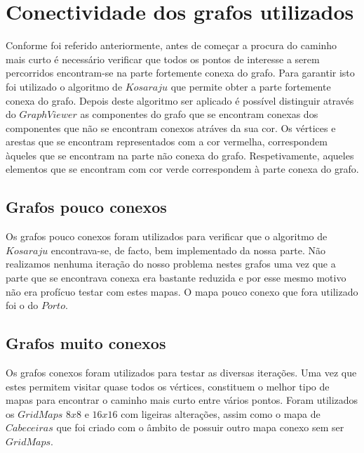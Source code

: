 \documentclass[article, a4paper, 12pt, oneside]{memoir}
\begin{document}
\newpage
\chapter[Conectividade dos grafos utilizados][Conectividade dos grafos utilizados]{Conectividade dos grafos utilizados} \label{\thechapter}

Conforme foi referido anteriormente, antes de começar a procura do caminho mais curto é necessário verificar que todos os pontos de interesse a serem percorridos encontram-se na
parte fortemente conexa do grafo. Para garantir isto foi utilizado o algoritmo de $Kosaraju$ que permite obter a parte fortemente conexa do grafo. Depois deste algoritmo ser aplicado
é possível distinguir através do $GraphViewer$ as componentes do grafo que se encontram conexas dos componentes que não se encontram conexos atráves da sua cor. Os vértices e arestas
que se encontram representados com a cor vermelha, correspondem àqueles que se encontram na parte não conexa do grafo. Respetivamente, aqueles elementos que se encontram com cor
verde correspondem à parte conexa do grafo.

\section{Grafos pouco conexos}
Os grafos pouco conexos foram utilizados para verificar que o algoritmo de $Kosaraju$ encontrava-se, de facto, bem implementado da nossa parte. Não 
realizamos nenhuma iteração do nosso problema nestes grafos uma vez que a parte que se encontrava conexa era bastante reduzida e por esse mesmo motivo não era profícuo
testar com estes mapas.
O mapa pouco conexo que fora utilizado foi o do $Porto$.

\section{Grafos muito conexos}
Os grafos conexos foram utilizados para testar as diversas iterações. Uma vez que estes permitem visitar quase todos os vértices, constituem o melhor tipo
de mapas para encontrar o caminho mais curto entre vários pontos. Foram utilizados os $GridMaps$ $8x8$ e $16x16$ com ligeiras alterações, assim como o mapa de $Cabeceiras$
que foi criado com o âmbito de possuir outro mapa conexo sem ser $GridMaps$.
\end{document}
